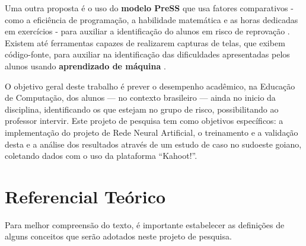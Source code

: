 \documentclass[
	12pt,				%
	openright,			%
	oneside,
	a4paper,			%
	english,			%
	french,				%
	spanish,			%
	brazil,				%
	]{abntex2}
\begin{document}
 Uma outra proposta é o uso do \textbf{modelo PreSS} que usa fatores comparativos - como a eficiência de programação, a habilidade matemática  e as horas dedicadas em exercícios - para auxiliar a identificação do alunos em risco de reprovação \cite{quille2018}. Existem até ferramentas capazes de realizarem capturas de telas, que exibem código-fonte, para auxiliar na identificação das dificuldades apresentadas pelos alunos usando \textbf{aprendizado de máquina} \cite{ahadi2016early}.
 
O objetivo geral deste trabalho é prever o desempenho acadêmico, na Educação de Computação, dos alunos --- no contexto brasileiro --- ainda no inicio da disciplina, identificando os que estejam no grupo de risco, possibilitando ao professor intervir. Este projeto de pesquisa tem como objetivos específicos: a implementação do projeto de Rede Neural Artificial, o treinamento e a validação desta e a análise dos resultados através de um estudo de caso no sudoeste goiano, coletando dados com o uso da plataforma ``Kahoot!''.



\chapter{Referencial Teórico}
Para melhor compreensão do texto, é importante estabelecer as definições de alguns conceitos que serão adotados neste projeto de pesquisa. 
\end{document}
